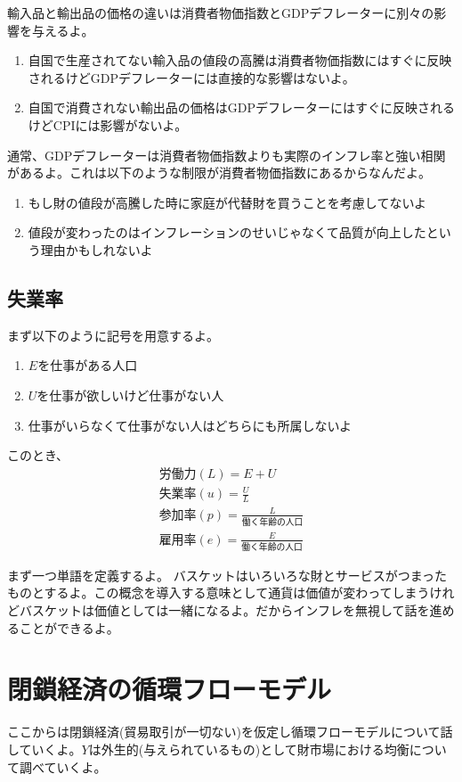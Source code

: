 \documentclass[a4paper, 12pt]{article}
\begin{document}
  輸入品と輸出品の価格の違いは消費者物価指数とGDPデフレーターに別々の影響を与えるよ。
  \begin{enumerate}
    \item 自国で生産されてない輸入品の値段の高騰は消費者物価指数にはすぐに反映されるけどGDPデフレーターには直接的な影響はないよ。
    \item 自国で消費されない輸出品の価格はGDPデフレーターにはすぐに反映されるけどCPIには影響がないよ。
  \end{enumerate}

  通常、GDPデフレーターは消費者物価指数よりも実際のインフレ率と強い相関があるよ。これは以下のような制限が消費者物価指数にあるからなんだよ。
  \begin{enumerate}
    \item もし財の値段が高騰した時に家庭が代替財を買うことを考慮してないよ
    \item 値段が変わったのはインフレーションのせいじゃなくて品質が向上したという理由かもしれないよ
  \end{enumerate}

\newpage

\subsection{失業率}
まず以下のように記号を用意するよ。
\begin{enumerate}
  \item $E$を仕事がある人口
  \item $U$を仕事が欲しいけど仕事がない人
  \item 仕事がいらなくて仕事がない人はどちらにも所属しないよ
\end{enumerate}
このとき、
\begin{displaymath}
  \begin{array}{l}
    \text{労働力}(L)=E+U \\
    \text{失業率}(u)=\frac{U}{L}\\
    \text{参加率}(p)=\frac{L}{\text{働く年齢の人口}}\\
    \text{雇用率}(e)=\frac{E}{\text{働く年齢の人口}}
  \end{array}
\end{displaymath}

\newpage

まず一つ単語を定義するよ。
バスケットはいろいろな財とサービスがつまったものとするよ。この概念を導入する意味として通貨は価値が変わってしまうけれどバスケットは価値としては一緒になるよ。だからインフレを無視して話を進めることができるよ。
\section{閉鎖経済の循環フローモデル}
ここからは閉鎖経済(貿易取引が一切ない)を仮定し循環フローモデルについて話していくよ。$Y$は外生的(与えられているもの)として財市場における均衡について調べていくよ。
\end{document}
